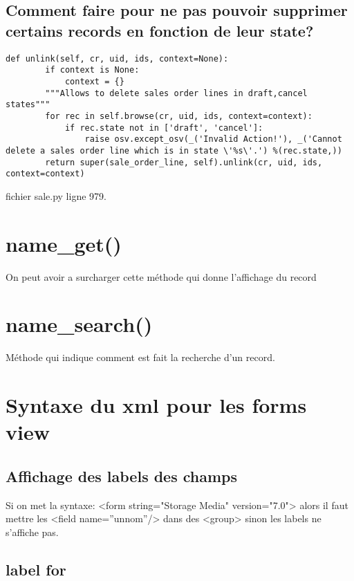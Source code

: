 \documentclass[12pt,a4paper]{article}
\begin{document}
\subsection{Comment faire pour ne pas pouvoir supprimer certains records en fonction de leur state?}
\label{sec:unlink_by_state}
\begin{verbatim}
def unlink(self, cr, uid, ids, context=None):
        if context is None:
            context = {}
        """Allows to delete sales order lines in draft,cancel states"""
        for rec in self.browse(cr, uid, ids, context=context):
            if rec.state not in ['draft', 'cancel']:
                raise osv.except_osv(_('Invalid Action!'), _('Cannot delete a sales order line which is in state \'%s\'.') %(rec.state,))
        return super(sale_order_line, self).unlink(cr, uid, ids, context=context)
\end{verbatim}
fichier sale.py ligne 979.

\section{name\_get()}
\label{sec:name_get}

On peut avoir a surcharger cette méthode qui donne l'affichage du record

\section{name\_search()}
\label{sec:get_name}
Méthode qui indique  comment est fait la recherche d'un record.


\section{Syntaxe du xml pour les forms view}
\label{sec:form_view}

\subsection{Affichage des labels des champs}
\label{sec:labels_7.0}

Si on met la syntaxe:
<form string="Storage Media" version="7.0">
alors il faut mettre les <field name=''unnom''/>
dans des <group> sinon les labels ne s'affiche pas. 

\subsection{label for}
\label{sec:labelfor}
\end{document}
